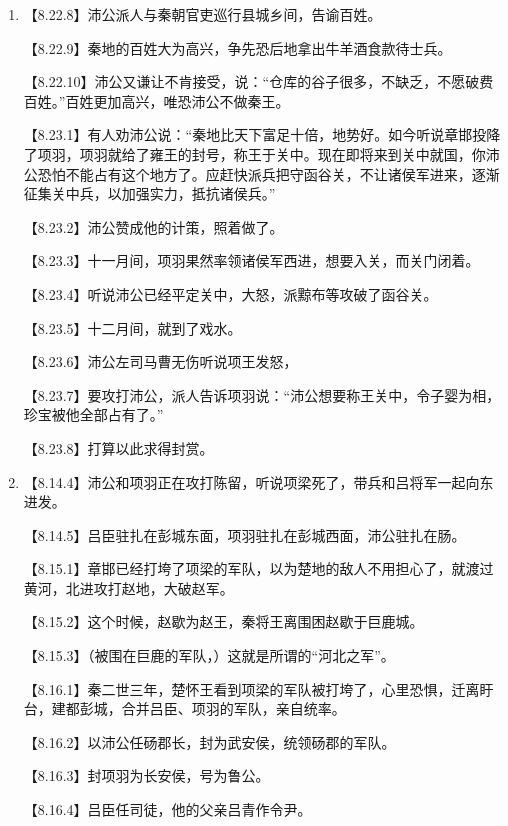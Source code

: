 \documentclass[fontset=none,11pt,a4paper]{ctexart}
\begin{document}
\begin{enumerate}[label=\Alph*.]
  \item
\noindent 【8.22.8】沛公派人与秦朝官吏巡行县城乡间，告谕百姓。\par
\noindent 【8.22.9】秦地的百姓大为高兴，争先恐后地拿出牛羊酒食款待士兵。\par
\noindent 【8.22.10】沛公又谦让不肯接受，说：“仓库的谷子很多，不缺乏，不愿破费百姓。”百姓更加高兴，唯恐沛公不做秦王。\par
\noindent 【8.23.1】有人劝沛公说：“秦地比天下富足十倍，地势好。如今听说章邯投降了项羽，项羽就给了雍王的封号，称王于关中。现在即将来到关中就国，你沛公恐怕不能占有这个地方了。应赶快派兵把守函谷关，不让诸侯军进来，逐渐征集关中兵，以加强实力，抵抗诸侯兵。”\par
\noindent 【8.23.2】沛公赞成他的计策，照着做了。\par
\noindent 【8.23.3】十一月间，项羽果然率领诸侯军西进，想要入关，而关门闭着。\par
\noindent 【8.23.4】听说沛公已经平定关中，大怒，派黥布等攻破了函谷关。\par
\noindent 【8.23.5】十二月间，就到了戏水。\par
\noindent 【8.23.6】沛公左司马曹无伤听说项王发怒，\par
\noindent 【8.23.7】要攻打沛公，派人告诉项羽说：“沛公想要称王关中，令子婴为相，珍宝被他全部占有了。”\par
\noindent 【8.23.8】打算以此求得封赏。\par
  \item
\noindent 【8.14.4】沛公和项羽正在攻打陈留，听说项梁死了，带兵和吕将军一起向东进发。\par
\noindent 【8.14.5】吕臣驻扎在彭城东面，项羽驻扎在彭城西面，沛公驻扎在肠。\par
\noindent 【8.15.1】章邯已经打垮了项梁的军队，以为楚地的敌人不用担心了，就渡过黄河，北进攻打赵地，大破赵军。\par
\noindent 【8.15.2】这个时候，赵歇为赵王，秦将王离围困赵歇于巨鹿城。\par
\noindent 【8.15.3】（被围在巨鹿的军队，）这就是所谓的“河北之军”。\par
\noindent 【8.16.1】秦二世三年，楚怀王看到项梁的军队被打垮了，心里恐惧，迁离盱台，建都彭城，合并吕臣、项羽的军队，亲自统率。\par
\noindent 【8.16.2】以沛公任砀郡长，封为武安侯，统领砀郡的军队。\par
\noindent 【8.16.3】封项羽为长安侯，号为鲁公。\par
\noindent 【8.16.4】吕臣任司徒，他的父亲吕青作令尹。\par

\end{enumerate}
\end{document}
